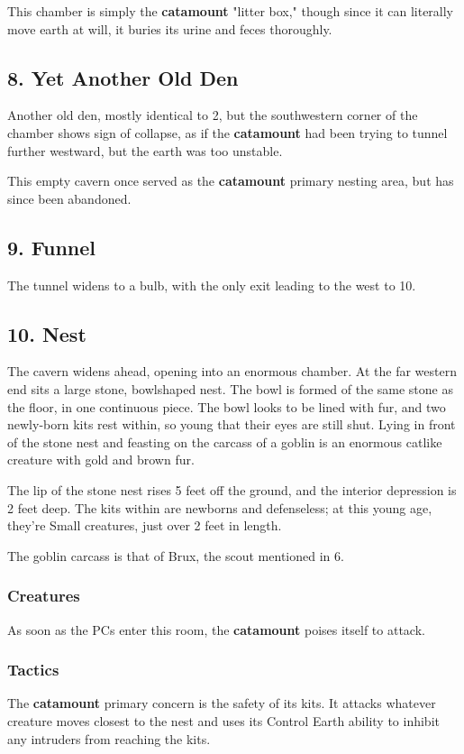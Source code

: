 \documentclass[10pt,a4paper,twoside,bg=print,twocolumn,openany,nodeprecatedcode]{dndbook}
\begin{document}
This chamber is simply the \textbf{catamount} "litter box," though since it can literally move earth at will, it buries its urine and feces thoroughly.

\subsection{8. Yet Another Old Den}
Another old den, mostly identical to 2, but the southwestern corner of the chamber shows sign of collapse, as if the \textbf{catamount} had been trying to tunnel further westward, but the earth was too unstable.

This empty cavern once served as the \textbf{catamount} primary nesting area, but has since been abandoned.

\subsection{9. Funnel}
The tunnel widens to a bulb, with the only exit leading to the west to 10.

\subsection{10. Nest}
\begin{DndReadAloud}{}
The cavern widens ahead, opening into an enormous chamber. At the far western end sits a large stone, bowlshaped nest. The bowl is formed of the same stone as the floor, in one continuous piece. The bowl looks to be lined with fur, and two newly-born kits rest within, so young that their eyes are still shut. Lying in front of the stone nest and feasting on the carcass of a goblin is an enormous catlike creature with gold and brown fur.

\end{DndReadAloud}

The lip of the stone nest rises 5 feet off the ground, and the interior depression is 2 feet deep. The kits within are newborns and defenseless; at this young age, they're Small creatures, just over 2 feet in length.

The goblin carcass is that of Brux, the scout mentioned in 6.

\subsubsection{Creatures}
As soon as the PCs enter this room, the \textbf{catamount} poises itself to attack.

\subsubsection{Tactics}
The \textbf{catamount} primary concern is the safety of its kits. It attacks whatever creature moves closest to the nest and uses its Control Earth ability to inhibit any intruders from reaching the kits.
\end{document}
